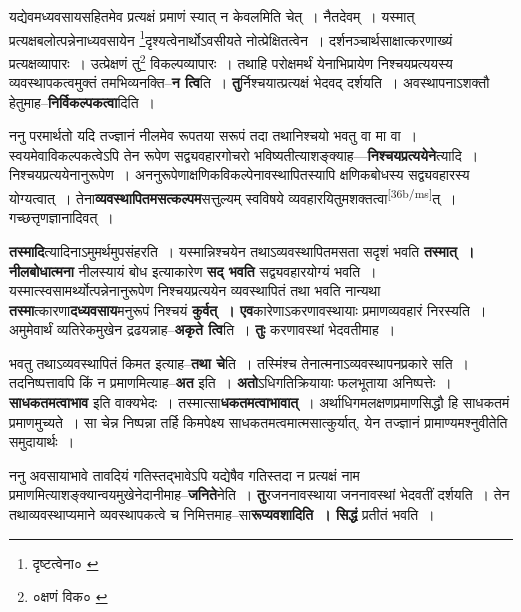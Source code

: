 \documentclass[article,12pt,a4paper]{memoir}
\begin{document}
	यद्येवमध्यवसायसहितमेव प्रत्यक्षं प्रमाणं स्यात् न केवलमिति चेत् । नैतदेवम् । यस्मात् प्रत्यक्षबलोत्पन्नेनाध्यवसायेन \footnote{दृष्टत्वेना० \cite{dp-msA} \cite{dp-msB} \cite{dp-msC} \cite{dp-msD} \cite{dp-edP} \cite{dp-edH} \cite{dp-edE} \cite{dp-edN}}दृश्यत्वेनार्थोऽवसीयते नोत्प्रेक्षितत्वेन । दर्शनञ्चार्थसाक्षात्करणाख्यं प्रत्यक्षव्यापारः । उत्प्रेक्षणं तु\footnote{०क्षणं विक० \cite{dp-msA} \cite{dp-msC} \cite{dp-msD}} विकल्पव्यापारः । तथाहि परोक्षमर्थं येनाभिप्रायेण निश्चयप्रत्ययस्य व्यवस्थापकत्वमुक्तं तमभिव्यनक्ति--\textbf{न त्वि}ति । \textbf{तु}र्निश्चयात्प्रत्यक्षं भेदवद् दर्शयति । अवस्थापनाऽशक्तौ हेतुमाह--\textbf{निर्विकल्पकत्वा}दिति ।
	\pend
      

	  \pstart ननु परमार्थतो यदि तज्ज्ञानं नीलमेव रूपतया सरूपं तदा तथानिश्चयो भवतु वा मा वा । स्वयमेवाविकल्पकत्वेऽपि तेन रूपेण सद्व्यवहारगोचरो भविष्यतीत्याशङ्क्याह—\textbf{निश्चयप्रत्ययेने}त्यादि । निश्चयप्रत्ययेनानुरूपेण । अननुरूपेणाक्षणिकविकल्पेनावस्थापितस्यापि क्षणिकबोधस्य सद्व्यवहारस्य योग्यत्वात् । तेना\textbf{व्यवस्थापितमसत्कल्पम}सत्तुल्यम् स्वविषये व्यवहारयितुमशक्तत्वा\leavevmode\textsuperscript{\rmlatinfont\tiny [36b/ms]}त् । गच्छत्तृणज्ञानादिवत् ।
	\pend
      

	  \pstart \textbf{तस्मादि}त्यादिनाऽमुमर्थमुपसंहरति । यस्मान्निश्चयेन तथाऽव्यवस्थापितमसता सदृशं भवति \textbf{तस्मात् । नीलबोधात्मना} नीलस्यायं बोध इत्याकारेण \textbf{सद् भवति} सद्व्यवहारयोग्यं भवति । यस्मात्स्वसामर्थ्योत्पन्नेनानुरूपेण निश्चयप्रत्ययेन व्यवस्थापितं तथा भवति नान्यथा \textbf{तस्मा}त्कारणा\textbf{दध्यवसाय}मनुरूपं निश्चयं \textbf{कुर्वत् । एव}कारेणाऽकरणावस्थायाः प्रमाणव्यवहारं निरस्यति । अमुमेवार्थं व्यतिरेकमुखेन द्रढयन्नाह--\textbf{अकृते त्वि}ति । \textbf{तुः} करणावस्थां भेदवतीमाह ।
	\pend
      

	  \pstart भवतु तथाऽव्यवस्थापितं किमत इत्याह--\textbf{तथा चे}ति । तस्मिंश्च तेनात्मनाऽव्यवस्थापनप्रकारे सति । तदनिष्पत्तावपि किं न प्रमाणमित्याह--\textbf{अत} इति । \textbf{अतो}ऽधिगतिक्रियायाः फलभूताया अनिष्पत्तेः । \textbf{साधकतमत्वाभाव} इति वाक्यभेदः । तस्मात्सा\textbf{धकतमत्वाभावात्} । अर्थाधिगमलक्षणप्रमाणसिद्धौ हि साधकतमं प्रमाणमुच्यते । सा चेन्न निष्पन्ना तर्हि किमपेक्ष्य साधकतमत्वमात्मसात्कुर्यात्, येन तज्ज्ञानं प्रामाण्यमश्नुवीतेति समुदायार्थः ।
	\pend
      

	  \pstart ननु अवसायाभावे तावदियं गतिस्तद्भावेऽपि यद्येषैव गतिस्तदा न प्रत्यक्षं नाम प्रमाणमित्याशङ्क्यान्वयमुखेनेदानीमाह--\textbf{जनिते}नेति । \textbf{तु}रजननावस्थाया जननावस्थां भेदवतीं दर्शयति । तेन तथाव्यवस्थाप्यमाने व्यवस्थापकत्वे च निमित्तमाह--सा\textbf{रूप्यवशादिति । सिद्धं} प्रतीतं भवति ।
	\pend
      
\end{document}
